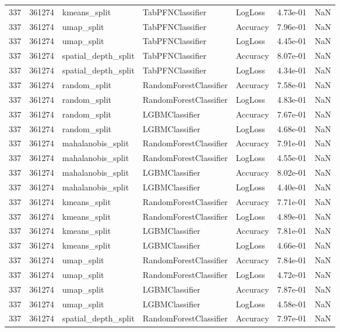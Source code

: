 \begin{tabular}{rrlllrr}
337 & 361274 & kmeans\_split & TabPFNClassifier & LogLoss & 4.73e-01 & NaN \\
337 & 361274 & umap\_split & TabPFNClassifier & Accuracy & 7.96e-01 & NaN \\
337 & 361274 & umap\_split & TabPFNClassifier & LogLoss & 4.45e-01 & NaN \\
337 & 361274 & spatial\_depth\_split & TabPFNClassifier & Accuracy & 8.07e-01 & NaN \\
337 & 361274 & spatial\_depth\_split & TabPFNClassifier & LogLoss & 4.34e-01 & NaN \\
337 & 361274 & random\_split & RandomForestClassifier & Accuracy & 7.58e-01 & NaN \\
337 & 361274 & random\_split & RandomForestClassifier & LogLoss & 4.83e-01 & NaN \\
337 & 361274 & random\_split & LGBMClassifier & Accuracy & 7.67e-01 & NaN \\
337 & 361274 & random\_split & LGBMClassifier & LogLoss & 4.68e-01 & NaN \\
337 & 361274 & mahalanobis\_split & RandomForestClassifier & Accuracy & 7.91e-01 & NaN \\
337 & 361274 & mahalanobis\_split & RandomForestClassifier & LogLoss & 4.55e-01 & NaN \\
337 & 361274 & mahalanobis\_split & LGBMClassifier & Accuracy & 8.02e-01 & NaN \\
337 & 361274 & mahalanobis\_split & LGBMClassifier & LogLoss & 4.40e-01 & NaN \\
337 & 361274 & kmeans\_split & RandomForestClassifier & Accuracy & 7.71e-01 & NaN \\
337 & 361274 & kmeans\_split & RandomForestClassifier & LogLoss & 4.89e-01 & NaN \\
337 & 361274 & kmeans\_split & LGBMClassifier & Accuracy & 7.81e-01 & NaN \\
337 & 361274 & kmeans\_split & LGBMClassifier & LogLoss & 4.66e-01 & NaN \\
337 & 361274 & umap\_split & RandomForestClassifier & Accuracy & 7.84e-01 & NaN \\
337 & 361274 & umap\_split & RandomForestClassifier & LogLoss & 4.72e-01 & NaN \\
337 & 361274 & umap\_split & LGBMClassifier & Accuracy & 7.87e-01 & NaN \\
337 & 361274 & umap\_split & LGBMClassifier & LogLoss & 4.58e-01 & NaN \\
337 & 361274 & spatial\_depth\_split & RandomForestClassifier & Accuracy & 7.97e-01 & NaN \\

\end{tabular}
